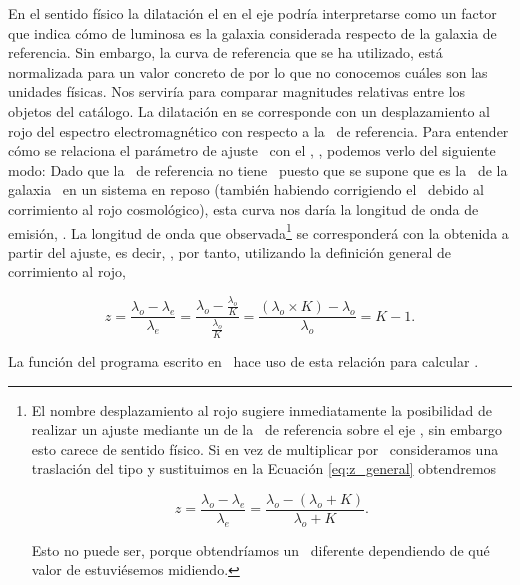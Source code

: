 En el sentido físico la dilatación el en el eje  podría interpretarse como un factor que indica cómo de luminosa es la galaxia considerada respecto de la galaxia de referencia. Sin embargo, la curva de referencia que se ha utilizado, está normalizada para un valor concreto de \maths{\lambda} por lo que no conocemos cuáles son las unidades físicas. Nos serviría para comparar magnitudes relativas entre los objetos del catálogo.
La dilatación en \maths{\lambda} se corresponde con un desplazamiento al rojo del espectro electromagnético con respecto a la \sed\ de referencia. Para entender cómo se relaciona el parámetro de ajuste \paramk\ con el \rt, \z, podemos verlo del siguiente modo:  Dado que la \sed\ de referencia no tiene \rt\ puesto que se supone que es la \sed\ de la galaxia \smm\ en un sistema en reposo (también habiendo corrigiendo el \rt\ debido al corrimiento al rojo cosmológico), esta curva nos daría la longitud de onda de emisión, . La longitud de onda que observada\footnote{El nombre desplazamiento al rojo sugiere inmediatamente la posibilidad de realizar un ajuste mediante un  de la \sed\ de referencia sobre el eje , sin embargo esto carece de sentido físico. Si en vez de multiplicar por \paramk\ consideramos una traslación del tipo  y sustituimos en la Ecuación \ref{eq:z_general} obtendremos

\begin{equation*}
 z = \frac{{\lambda}_{o} - {\lambda}_{e}}{{\lambda}_{e}} = \frac{{\lambda}_{o} - ({\lambda}_{o} + K) }{ {\lambda}_{o} + K } .
\end{equation*}

Esto no puede ser, porque obtendríamos un \rt\ diferente dependiendo de qué valor de \maths{\lambda} estuviésemos midiendo. 

} se corresponderá con la obtenida a partir del ajuste, es decir, , por tanto, utilizando la definición general de corrimiento al rojo,

\begin{equation*}
 z = \frac{{\lambda}_{o} - {\lambda}_{e}}{{\lambda}_{e}} = \frac{{\lambda}_{o} - \frac{{\lambda}_{o}}{K} }{ \frac{{\lambda}_{o}}{K} } = \frac{ ({\lambda}_{o} \times K) - {\lambda}_{o}}{{\lambda}_{o}} = K - 1.
\end{equation*}

La función del programa escrito en \python\ hace uso de esta relación para calcular \z.

